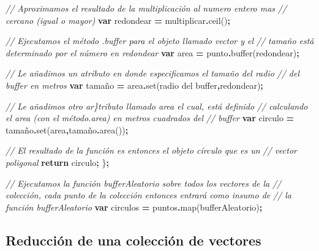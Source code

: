 \documentclass[
  12pt,
  letterpaper,
  twoside]{book}
\newenvironment{Shaded}{\begin{snugshade}}{\end{snugshade}}
\newcommand{\CommentTok}[1]{\textcolor[rgb]{0.56,0.35,0.01}{\textit{#1}}}
\newcommand{\ControlFlowTok}[1]{\textcolor[rgb]{0.13,0.29,0.53}{\textbf{#1}}}
\newcommand{\FunctionTok}[1]{\textcolor[rgb]{0.00,0.00,0.00}{#1}}
\newcommand{\KeywordTok}[1]{\textcolor[rgb]{0.13,0.29,0.53}{\textbf{#1}}}
\newcommand{\NormalTok}[1]{#1}
\newcommand{\OperatorTok}[1]{\textcolor[rgb]{0.81,0.36,0.00}{\textbf{#1}}}
\newcommand{\StringTok}[1]{\textcolor[rgb]{0.31,0.60,0.02}{#1}}
\begin{document}
\begin{Shaded}
\begin{Highlighting}[]
  \CommentTok{// Aproximamos el resultado de la multiplicación al numero entero mas }
  \CommentTok{// cercano (igual o mayor)}
  \KeywordTok{var}\NormalTok{ redondear }\OperatorTok{=}\NormalTok{ multiplicar}\OperatorTok{.}\FunctionTok{ceil}\NormalTok{()}\OperatorTok{;} 
  
  \CommentTok{// Ejecutamos el método .buffer para el objeto llamado \textquotesingle{}vector\textquotesingle{} y el }
  \CommentTok{// tamaño está determinado por el número en \textquotesingle{}redondear\textquotesingle{}}
  \KeywordTok{var}\NormalTok{ area }\OperatorTok{=}\NormalTok{ punto}\OperatorTok{.}\FunctionTok{buffer}\NormalTok{(redondear)}\OperatorTok{;}

  \CommentTok{// Le añadimos un atributo en donde especificamos el tamaño del radio }
  \CommentTok{// del buffer en metros}
  \KeywordTok{var}\NormalTok{ tamaño }\OperatorTok{=}\NormalTok{ area}\OperatorTok{.}\FunctionTok{set}\NormalTok{(}\StringTok{\textquotesingle{}radio del buffer\textquotesingle{}}\OperatorTok{,}\NormalTok{redondear)}\OperatorTok{;}  

  \CommentTok{// Le añadimos otro ar\}tributo llamado \textquotesingle{}area\textquotesingle{} el cual, está definido }
  \CommentTok{// calculando el area (con el método.area) en metros cuadrados del }
  \CommentTok{// buffer }
  \KeywordTok{var}\NormalTok{ circulo }\OperatorTok{=}\NormalTok{ tamaño}\OperatorTok{.}\FunctionTok{set}\NormalTok{(}\StringTok{\textquotesingle{}area\textquotesingle{}}\OperatorTok{,}\NormalTok{tamaño}\OperatorTok{.}\FunctionTok{area}\NormalTok{())}\OperatorTok{;}  

  \CommentTok{// El resultado de la función es entonces el objeto círculo que es un }
  \CommentTok{// vector poligonal }
  \ControlFlowTok{return}\NormalTok{ circulo}\OperatorTok{;}
\NormalTok{\}}\OperatorTok{;}

\CommentTok{// Ejecutamos la función \textquotesingle{}bufferAleatorio\textquotesingle{} sobre todos los vectores de la }
\CommentTok{// colección, cada punto de la colección entonces entrará como insumo de }
\CommentTok{// la función bufferAleatorio}
\KeywordTok{var}\NormalTok{ circulos }\OperatorTok{=}\NormalTok{ puntos}\OperatorTok{.}\FunctionTok{map}\NormalTok{(bufferAleatorio)}\OperatorTok{;} 
\end{Highlighting}
\end{Shaded}

\hypertarget{reducciuxf3n-de-una-colecciuxf3n-de-vectores}{%
\subsection{Reducción de una colección de vectores}\label{reducciuxf3n-de-una-colecciuxf3n-de-vectores}}
\end{document}
